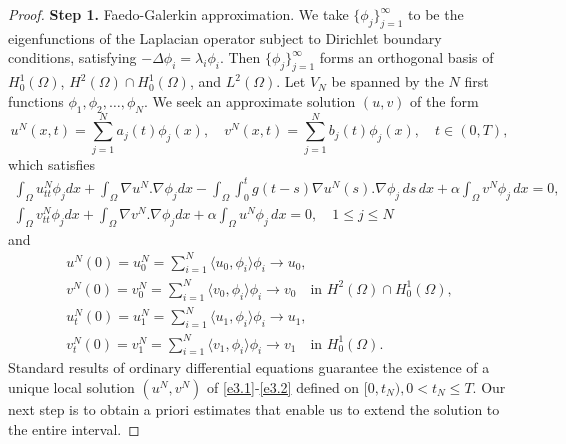\documentclass[reqno]{amsart}
\begin{document}
\begin{proof} \quad

\noindent\textbf{Step 1.} Faedo-Galerkin approximation.
We take
\(\{ \phi_j \}_{j=1}^\infty\)
to be the eigenfunctions of the Laplacian operator subject to Dirichlet boundary conditions, satisfying $-\Delta \phi_i = \lambda_i \phi_i $. Then
$\{\phi_j\}_{j=1}^\infty$ forms an orthogonal basis of $ H_0^1(\Omega)$,
\( H^2(\Omega) \cap H_0^1(\Omega) \), and \( L^2(\Omega) \).
Let $V_{N}$ be spanned by the $N$ first functions $ \phi_1, \phi_2, \dots, \phi_N $.
We seek  an approximate solution $(u,v)$ of the form
\[
u^N(x,t) = \sum_{j=1}^N a_j(t) \phi_j(x), \quad
v^N(x,t) = \sum_{j=1}^N b_j(t) \phi_j(x), \quad t\in (0,T),
\]
which satisfies
\begin{gather*}
\int_\Omega u_{tt}^N \phi_j dx + \int_\Omega \nabla u^N .\nabla \phi_j dx - \int_\Omega \int_0^t g(t-s) \nabla u^N(s) .\nabla \phi_j\, ds\,dx+ \alpha \int_\Omega v^N \phi_j \, dx = 0,\\
\int_\Omega v_{tt}^N \phi_j dx + \int_\Omega \nabla v^N .\nabla \phi_j dx+ \alpha \int_\Omega u^N \phi_j \, dx = 0,\quad 1\leq j\leq N
\label{e3.1}
\end{gather*}
and
\begin{equation} \label{e3.2}
\begin{gathered}
 u^{N}(0) = u^{N}_0= \sum_{i=1}^{N} \langle u_0, \phi_i \rangle \phi_i
 \to u_0, \\
  v^{N}(0) = v^{N}_0 = \sum_{i=1}^{N} \langle v_0, \phi_i \rangle \phi_i
 \to v_0 \quad \text{in } H^2(\Omega) \cap H_0^1(\Omega), \\
 u_{t}^N(0) = u_1^N = \sum_{i=1}^{N} \langle u_1, \phi_i \rangle \phi_i \to u_{1}, \\
 v_{t}^N(0) = v_1^N = \sum_{i=1}^{N} \langle v_1, \phi_i \rangle \phi_i \to v_{1} \quad \text{in } H^1_0(\Omega).
 \end{gathered}
\end{equation}
Standard results of ordinary differential equations guarantee the existence of
a unique local solution
$ (u^N, v^N )$ of \eqref{e3.1}-\eqref{e3.2} defined on
$ [0, t_{N}), 0 < t_{N} \leq T $.
Our next step is to obtain a priori estimates that enable us to extend the
solution to the entire interval.
\smallskip


\end{proof}
\end{document}
